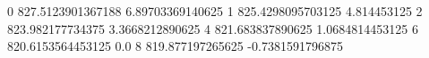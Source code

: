 0 827.5123901367188 6.89703369140625
1 825.4298095703125 4.814453125
2 823.982177734375 3.3668212890625
4 821.683837890625 1.0684814453125
6 820.6153564453125 0.0
8 819.877197265625 -0.7381591796875
